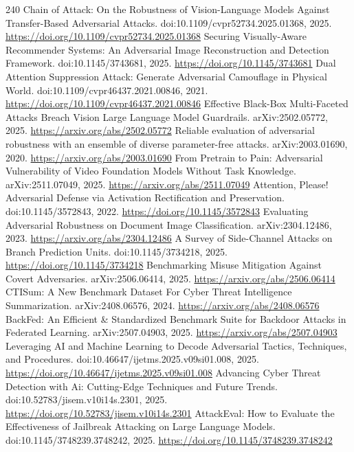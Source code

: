 \documentclass[11pt]{article}
\begin{document}
\begin{thebibliography}{240}
 Chain of Attack: On the Robustness of Vision-Language Models Against Transfer-Based Adversarial Attacks. doi:10.1109/cvpr52734.2025.01368, 2025. \url{https://doi.org/10.1109/cvpr52734.2025.01368}
 Securing Visually-Aware Recommender Systems: An Adversarial Image Reconstruction and Detection Framework. doi:10.1145/3743681, 2025. \url{https://doi.org/10.1145/3743681}
 Dual Attention Suppression Attack: Generate Adversarial Camouflage in Physical World. doi:10.1109/cvpr46437.2021.00846, 2021. \url{https://doi.org/10.1109/cvpr46437.2021.00846}
 Effective Black-Box Multi-Faceted Attacks Breach Vision Large Language Model Guardrails. arXiv:2502.05772, 2025. \url{https://arxiv.org/abs/2502.05772}
 Reliable evaluation of adversarial robustness with an ensemble of diverse parameter-free attacks. arXiv:2003.01690, 2020. \url{https://arxiv.org/abs/2003.01690}
 From Pretrain to Pain: Adversarial Vulnerability of Video Foundation Models Without Task Knowledge. arXiv:2511.07049, 2025. \url{https://arxiv.org/abs/2511.07049}
 Attention, Please! Adversarial Defense via Activation Rectification and Preservation. doi:10.1145/3572843, 2022. \url{https://doi.org/10.1145/3572843}
 Evaluating Adversarial Robustness on Document Image Classification. arXiv:2304.12486, 2023. \url{https://arxiv.org/abs/2304.12486}
 A Survey of Side-Channel Attacks on Branch Prediction Units. doi:10.1145/3734218, 2025. \url{https://doi.org/10.1145/3734218}
 Benchmarking Misuse Mitigation Against Covert Adversaries. arXiv:2506.06414, 2025. \url{https://arxiv.org/abs/2506.06414}
 CTISum: A New Benchmark Dataset For Cyber Threat Intelligence Summarization. arXiv:2408.06576, 2024. \url{https://arxiv.org/abs/2408.06576}
 BackFed: An Efficient \& Standardized Benchmark Suite for Backdoor Attacks in Federated Learning. arXiv:2507.04903, 2025. \url{https://arxiv.org/abs/2507.04903}
 Leveraging AI and Machine Learning to Decode Adversarial Tactics, Techniques, and Procedures. doi:10.46647/ijetms.2025.v09si01.008, 2025. \url{https://doi.org/10.46647/ijetms.2025.v09si01.008}
 Advancing Cyber Threat Detection with Ai: Cutting-Edge Techniques and Future Trends. doi:10.52783/jisem.v10i14s.2301, 2025. \url{https://doi.org/10.52783/jisem.v10i14s.2301}
 AttackEval: How to Evaluate the Effectiveness of Jailbreak Attacking on Large Language Models. doi:10.1145/3748239.3748242, 2025. \url{https://doi.org/10.1145/3748239.3748242}

\end{thebibliography}
\end{document}
